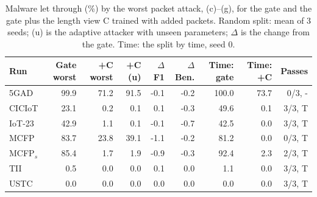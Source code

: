 \begin{table}[t]
\centering
\caption{Malware let through (\%) by the worst packet attack, (c)--(g), for the gate and the gate plus the length view C trained with added packets. Random split: mean of 3 seeds; (u) is the adaptive attacker with unseen parameters; $\Delta$ is the change from the gate. Time: the split by time, seed 0.}
\label{tab:length-view}
\setlength{\tabcolsep}{4pt}
\begin{tabular}{lrrrrrrrr}
\toprule
Run & Gate worst & +C worst & +C (u) & $\Delta$F1 & $\Delta$Ben. & Time: gate & Time: +C & Passes \\
\midrule
5GAD & 99.9 & 71.2 & 91.5 & -0.1 & -0.2 & 100.0 & 73.7 & 0/3, - \\
CICIoT & 23.1 & 0.2 & 0.1 & 0.1 & -0.3 & 49.6 & 0.1 & 3/3, T \\
IoT-23 & 42.9 & 1.1 & 0.1 & -0.1 & -0.7 & 42.5 & 0.0 & 3/3, T \\
MCFP & 83.7 & 23.8 & 39.1 & -1.1 & -0.2 & 81.2 & 0.0 & 0/3, T \\
MCFP$_{s}$ & 85.4 & 1.7 & 1.9 & -0.9 & -0.3 & 92.4 & 2.3 & 2/3, T \\
TII & 0.5 & 0.0 & 0.0 & 0.1 & 0.0 & 1.1 & 0.0 & 3/3, T \\
USTC & 0.0 & 0.0 & 0.0 & 0.0 & 0.0 & 0.0 & 0.0 & 3/3, T \\
\bottomrule
\end{tabular}
\end{table}
